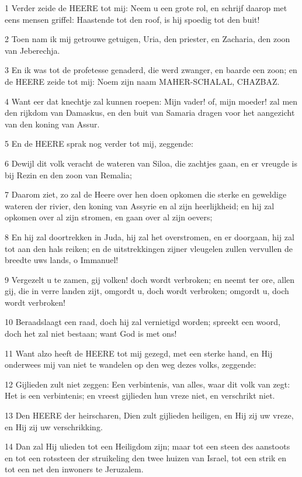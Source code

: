 \par 1 Verder zeide de HEERE tot mij: Neem u een grote rol, en schrijf daarop met eens mensen griffel: Haastende tot den roof, is hij spoedig tot den buit!
\par 2 Toen nam ik mij getrouwe getuigen, Uria, den priester, en Zacharia, den zoon van Jeberechja.
\par 3 En ik was tot de profetesse genaderd, die werd zwanger, en baarde een zoon; en de HEERE zeide tot mij: Noem zijn naam MAHER-SCHALAL, CHAZBAZ.
\par 4 Want eer dat knechtje zal kunnen roepen: Mijn vader! of, mijn moeder! zal men den rijkdom van Damaskus, en den buit van Samaria dragen voor het aangezicht van den koning van Assur.
\par 5 En de HEERE sprak nog verder tot mij, zeggende:
\par 6 Dewijl dit volk veracht de wateren van Siloa, die zachtjes gaan, en er vreugde is bij Rezin en den zoon van Remalia;
\par 7 Daarom ziet, zo zal de Heere over hen doen opkomen die sterke en geweldige wateren der rivier, den koning van Assyrie en al zijn heerlijkheid; en hij zal opkomen over al zijn stromen, en gaan over al zijn oevers;
\par 8 En hij zal doortrekken in Juda, hij zal het overstromen, en er doorgaan, hij zal tot aan den hals reiken; en de uitstrekkingen zijner vleugelen zullen vervullen de breedte uws lands, o Immanuel!
\par 9 Vergezelt u te zamen, gij volken! doch wordt verbroken; en neemt ter ore, allen gij, die in verre landen zijt, omgordt u, doch wordt verbroken; omgordt u, doch wordt verbroken!
\par 10 Beraadslaagt een raad, doch hij zal vernietigd worden; spreekt een woord, doch het zal niet bestaan; want God is met ons!
\par 11 Want alzo heeft de HEERE tot mij gezegd, met een sterke hand, en Hij onderwees mij van niet te wandelen op den weg dezes volks, zeggende:
\par 12 Gijlieden zult niet zeggen: Een verbintenis, van alles, waar dit volk van zegt: Het is een verbintenis; en vreest gijlieden hun vreze niet, en verschrikt niet.
\par 13 Den HEERE der heirscharen, Dien zult gijlieden heiligen, en Hij zij uw vreze, en Hij zij uw verschrikking.
\par 14 Dan zal Hij ulieden tot een Heiligdom zijn; maar tot een steen des aanstoots en tot een rotssteen der struikeling den twee huizen van Israel, tot een strik en tot een net den inwoners te Jeruzalem.
